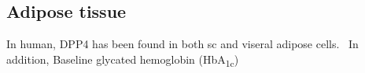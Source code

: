 \subsection{Adipose tissue}
In human, DPP4 has been found in both sc and viseral adipose cells.~\cite{Lamers2011} In addition, Baseline glycated hemoglobin (HbA\textsubscript{1c}) 